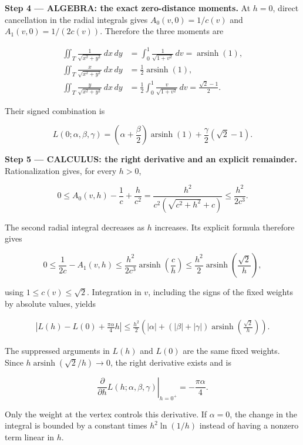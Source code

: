 \documentclass[11pt,oneside,openany]{book}
\begin{document}
\begingroup\color{AlgebraBlue}
\textbf{Step 4 --- ALGEBRA: the exact zero-distance moments.} At \(h=0\), direct cancellation in the radial integrals gives \(A_0(v,0)=1/c(v)\) and \(A_1(v,0)=1/(2c(v))\). Therefore the three moments are

\[
\begin{aligned}
\iint_T\frac1{\sqrt{x^2+y^2}}\,dx\,dy
&=\int_0^1\frac1{\sqrt{1+v^2}}\,dv=\operatorname{arsinh}(1),\\
\iint_T\frac{x}{\sqrt{x^2+y^2}}\,dx\,dy
&=\frac12\operatorname{arsinh}(1),\\
\iint_T\frac{y}{\sqrt{x^2+y^2}}\,dx\,dy
&=\frac12\int_0^1\frac v{\sqrt{1+v^2}}\,dv
=\frac{\sqrt2-1}{2}.
\end{aligned}
\]

Their signed combination is

\[
L(0;\alpha,\beta,\gamma)
=\left(\alpha+\frac\beta2\right)\operatorname{arsinh}(1)
+\frac\gamma2(\sqrt2-1).
\]

\endgroup
\textbf{Step 5 --- CALCULUS: the right derivative and an explicit remainder.} Rationalization gives, for every \(h>0\),

\[
0\le A_0(v,h)-\frac1c+\frac h{c^2}
=\frac{h^2}{c^2(\sqrt{c^2+h^2}+c)}\le\frac{h^2}{2c^3}.
\]

The second radial integral decreases as \(h\) increases. Its explicit formula therefore gives

\[
0\le\frac1{2c}-A_1(v,h)
\le\frac{h^2}{2c^3}\operatorname{arsinh}\left(\frac ch\right)
\le\frac{h^2}{2}\operatorname{arsinh}\left(\frac{\sqrt2}{h}\right),
\]

using \(1\le c(v)\le\sqrt2\). Integration in \(v\), including the signs of the fixed weights by absolute values, yields

\[
\begin{aligned}
\left|L(h)-L(0)+\frac{\pi\alpha}{4}h\right|
\le\frac{h^2}{2}\left(
|\alpha|+(|\beta|+|\gamma|)\operatorname{arsinh}\left(\frac{\sqrt2}{h}\right)
\right).
\end{aligned}
\]

The suppressed arguments in \(L(h)\) and \(L(0)\) are the same fixed weights. Since \(h\operatorname{arsinh}(\sqrt2/h)\to0\), the right derivative exists and is

\[
\left.\frac{\partial}{\partial h}L(h;\alpha,\beta,\gamma)\right|_{h=0^+}
=-\frac{\pi\alpha}{4}.
\]

Only the weight at the vertex controls this derivative. If \(\alpha=0\), the change in the integral is bounded by a constant times \(h^2\ln(1/h)\) instead of having a nonzero term linear in \(h\).
\end{document}
